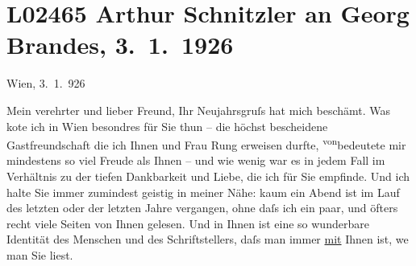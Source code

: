 

\section[Arthur Schnitzler an Georg Brandes, 3. 1. 1926]{L02465 Arthur Schnitzler an Georg Brandes, 3. 1. 1926}
\nopagebreak{}
\rehead{ }\normalsize\beginnumbering{}
\toendnotes[C]{\smallbreak\pagebreak[2]}
\pstart
           \raggedleft{}{\pb}Wien, 3. 1. 926\pend
           
\pstart{}Mein verehrter und lieber Freund,\pend\vspace{0.5em}
\pstart
           Ihr Neujahrsgruſs hat mich beschämt. Was ko{\geminationn}te ich in
                  Wien besondres für Sie thun – die höchst
               bescheidene Gastfreundschaft die ich Ihnen und Frau Rung erweisen durfte, \substVorne{}\textsuperscript{von}\substDazwischen{}bedeutete\substHinten{} mir mindestens so viel Freude als Ihnen – und wie wenig war es in jedem Fall
               im Verhältnis zu der tiefen Dankbarkeit und Liebe, die ich für Sie empfinde. Und ich
               halte Sie immer zumindest geistig in meiner Nähe: kaum ein Abend ist im Lauf des
               letzten oder der letzten Jahre vergangen, ohne daſs ich ein paar, und öfters recht
               viele Seiten von Ihnen gelesen. Und in Ihnen ist eine so wunder{\pb}bare Identität des Menschen und des
               Schriftstellers, daſs man immer \uline{mit} Ihnen ist, we{\geminationn} man Sie liest.\pend
           
